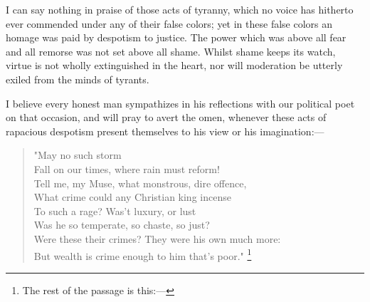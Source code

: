I can say nothing in praise of those acts of tyranny, which no voice has hitherto ever commended under any of their false colors; yet in these false colors an homage was paid by despotism to justice. The power which was above all fear and all remorse was not set above all shame. Whilst shame keeps its watch, virtue is not wholly extinguished in the heart, nor will moderation be utterly exiled from the minds of tyrants.

I believe every honest man sympathizes in his reflections with our political poet on that occasion, and will pray to avert the omen, whenever these acts of rapacious despotism present themselves to his view or his imagination:—

\begin{verse}
"May no such storm \\
Fall on our times, where rain must reform! \\
Tell me, my Muse, what monstrous, dire offence, \\
What crime could any Christian king incense \\
To such a rage? Was't luxury, or lust \\
Was he so temperate, so chaste, so just? \\
Were these their crimes? They were his own much more: \\
But wealth is crime enough to him that's poor."
\footnote{ The rest of the passage is this:—

}
\end{verse}
